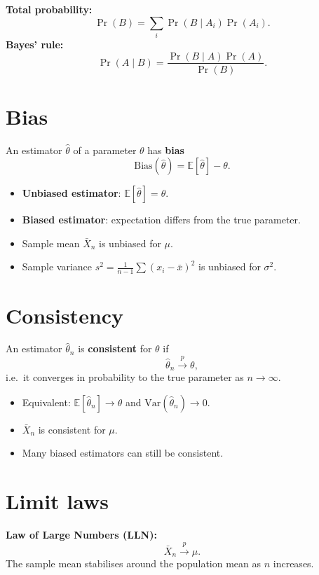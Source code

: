 \documentclass[11pt]{article}
\begin{document}
\textbf{Total probability:}
\[
\Pr(B)=\sum_i \Pr(B\mid A_i)\Pr(A_i).
\]
\textbf{Bayes' rule:}
\[
\Pr(A\mid B)=\frac{\Pr(B\mid A)\Pr(A)}{\Pr(B)}.
\]

\section*{Bias}

An estimator $\hat{\theta}$ of a parameter $\theta$ has \textbf{bias}
\[
\text{Bias}(\hat{\theta}) = \mathbb{E}[\hat{\theta}] - \theta.
\]

\begin{itemize}
	\item \textbf{Unbiased estimator}: $\mathbb{E}[\hat{\theta}] = \theta$.
	\item \textbf{Biased estimator}: expectation differs from the true parameter.
	\item Sample mean $\bar X_n$ is unbiased for $\mu$.
	\item Sample variance $s^2 = \frac{1}{n-1}\sum (x_i - \bar x)^2$ is unbiased for $\sigma^2$.
\end{itemize}

\section*{Consistency}

An estimator $\hat{\theta}_n$ is \textbf{consistent} for $\theta$ if
\[
\hat{\theta}_n \xrightarrow{p} \theta,
\]
i.e.\ it converges in probability to the true parameter as $n \to \infty$.

\begin{itemize}
	\item Equivalent: $\mathbb{E}[\hat{\theta}_n] \to \theta$ and $\mathrm{Var}(\hat{\theta}_n) \to 0$.
	\item $\bar X_n$ is consistent for $\mu$.
	\item Many biased estimators can still be consistent.
\end{itemize}

\section*{Limit laws}

\textbf{Law of Large Numbers (LLN):}
\[
\bar X_n \xrightarrow{p} \mu.
\]
The sample mean stabilises around the population mean as $n$ increases.
\end{document}
